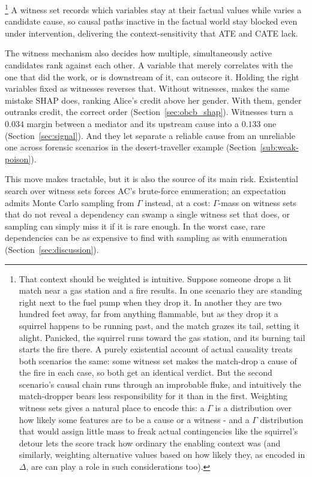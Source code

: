 \footnote{That context should be weighted is intuitive. Suppose someone drops
a lit match near a gas station and a fire results. In one scenario they are
standing right next to the fuel pump when they drop it. In another they are
two hundred feet away, far from anything flammable, but as they drop it a
squirrel happens to be running past, and the match grazes its tail, setting
it alight. Panicked, the squirrel runs toward the gas station, and its
burning tail starts the fire there. A purely existential account of actual
causality treats both scenarios the same: some witness set makes the
match-drop a cause of the fire in each case, so both get an identical
verdict. But the second scenario's causal chain runs through an improbable
fluke, and intuitively the match-dropper bears less responsibility for it
than in the first. Weighting witness sets gives \ourapproach a natural place
to encode this: a $\Gamma$ is  a distribution over how likely some features are to be a cause or 
a witness - and a $\Gamma$ distribution that would  assign little mass to freak actual contingencies
like the squirrel's detour lets the score track how ordinary the enabling
context was (and similarly, weighting alternative values based on how likely they, as encoded in $\Delta$, are can play a role in such considerations too).}
A witness set records which variables stay at their factual values while
\ourapproach varies a candidate cause, so causal paths inactive in the factual world stay
blocked even under intervention, delivering the
context-sensitivity that ATE and CATE lack.

The witness mechanism also decides how multiple, simultaneously active
candidates rank against each other. A variable that merely correlates with the
one that did the work, or is downstream of it, can outscore it. Holding the
right variables fixed as witnesses reverses that. Without witnesses,
\ourapproach makes the same mistake SHAP does, ranking Alice's credit above
her gender. With them, gender outranks credit, the correct order
(Section~\ref{sec:obcb_shap}). Witnesses turn a $0.034$ margin between a
mediator and its upstream cause into a $0.133$ one (Section~\ref{sec:signal}).
And they let \ourapproach separate a reliable cause from an unreliable one
across forensic scenarios in the desert-traveller example
(Section~\ref{sub:weak-poison}).

This move makes \ourapproach tractable, but it is also the source of its main risk. Existential search over witness sets forces AC's brute-force enumeration; an
expectation admits Monte Carlo sampling from $\Gamma$ instead, at a cost: $\Gamma$-mass on witness sets that do not reveal a dependency can swamp a single witness set that does, or sampling can simply miss it if it is rare enough. In the worst case, rare dependencies can be as expensive to find with sampling as with enumeration (Section~\ref{sec:discussion}).

